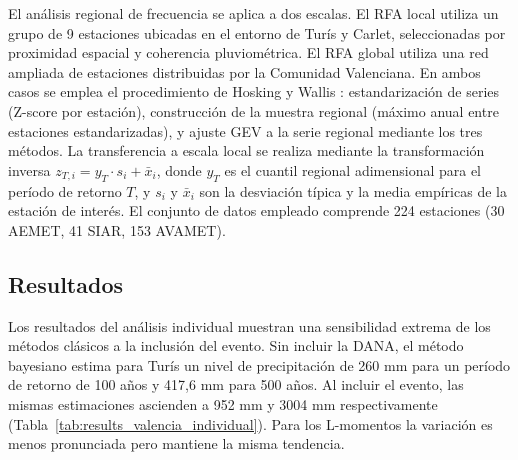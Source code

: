 El análisis regional de frecuencia se aplica a dos escalas. El RFA local utiliza un grupo de 9 estaciones ubicadas en el entorno de Turís y Carlet, seleccionadas por proximidad espacial y coherencia pluviométrica. El RFA global utiliza una red ampliada de estaciones distribuidas por la Comunidad Valenciana. En ambos casos se emplea el procedimiento de Hosking y Wallis \parencite{hosking1997rfa}: estandarización de series (Z-score por estación), construcción de la muestra regional (máximo anual entre estaciones estandarizadas), y ajuste GEV a la serie regional mediante los tres métodos. La transferencia a escala local se realiza mediante la transformación inversa $z_{T,i} = y_T \cdot s_i + \bar{x}_i$, donde $y_T$ es el cuantil regional adimensional para el período de retorno $T$, y $s_i$ y $\bar{x}_i$ son la desviación típica y la media empíricas de la estación de interés. El conjunto de datos empleado comprende 224 estaciones (30 AEMET, 41 SIAR, 153 AVAMET).

\subsection{Resultados}

Los resultados del análisis individual muestran una sensibilidad extrema de los métodos clásicos a la inclusión del evento. Sin incluir la DANA, el método bayesiano estima para Turís un nivel de precipitación de 260 mm para un período de retorno de 100 años y 417,6 mm para 500 años. Al incluir el evento, las mismas estimaciones ascienden a 952 mm y 3004 mm respectivamente (Tabla~\ref{tab:results_valencia_individual}). Para los L-momentos la variación es menos pronunciada pero mantiene la misma tendencia.

\begin{table}[htbp]
  \centering
  \caption{Niveles de precipitación estimados (mm) para distintos períodos de retorno en Turís y Carlet. Análisis individual. El valor bayesiano se expresa en mm; MLE y L-momentos como porcentaje de cambio respecto al bayesiano.}
  \label{tab:results_valencia_individual}
\end{table}

